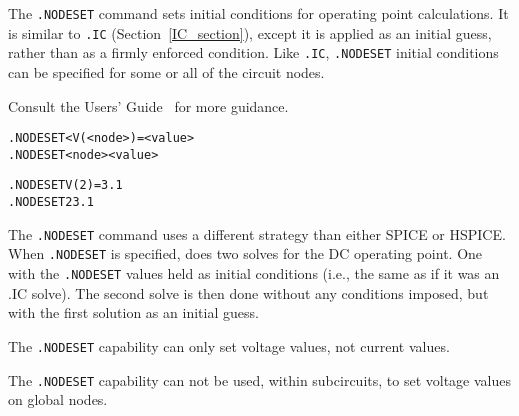 


\label{NODESET_section}

The \texttt{.NODESET} command sets initial conditions for operating point
calculations.  It is similar to \texttt{.IC} (Section~\ref{IC_section}), except 
it is applied as an initial guess, rather than as a firmly enforced
condition. Like \texttt{.IC}, \texttt{.NODESET} initial conditions can be specified
for some or all of the circuit nodes.

Consult the \Xyce{} Users' Guide~\UsersGuide{} for more guidance.

\begin{Command}

\format
\begin{alltt}
.NODESET < V(<node>)=<value>
.NODESET <node> <value>
\end{alltt}

\examples
\begin{alltt}
.NODESET V(2)=3.1
.NODESET 2 3.1
\end{alltt}

\comments
The \Xyce{} \texttt{.NODESET} command uses a different strategy than either
SPICE or HSPICE.  When \texttt{.NODESET} is specified, \Xyce{} does two solves
for the DC operating point.  One with the \texttt{.NODESET} values held as 
initial conditions (i.e., the same as if it was an .IC solve). The second solve
is then done without any conditions imposed, but with the first solution as an
initial guess. 

The \texttt{.NODESET} capability can only set voltage values, not current values.

The \texttt{.NODESET} capability can not be used, within subcircuits, to set voltage values on global nodes.

\end{Command}

